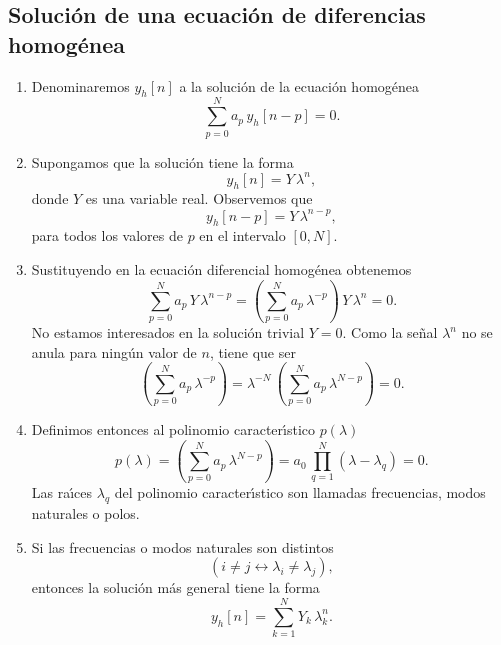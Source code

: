 \subsection{Soluci\'{o}n de una ecuaci\'{o}n de diferencias homog\'{e}nea}

\begin{enumerate}

\item Denominaremos $y_{h}\left[ n\right] $ a la soluci\'{o}n de la ecuaci\'{o}n homog\'{e}nea
\begin{equation}
        \sum_{p=0}^{N}a_{p} \, y_{h}\left[ n-p\right] =0.
\end{equation}

\item Supongamos que la soluci\'{o}n tiene la forma 
\begin{equation}
        y_{h}\left[ n\right] = Y \, \lambda^n,
\end{equation}
donde $Y$ es una variable real. Observemos que 
\begin{equation}
    y_{h}\left[ n-p\right] = Y \, \lambda^{n-p},
\end{equation}
para todos los valores de $p$ en el intervalo $[0,N]$.

\item Sustituyendo en la ecuaci\'{o}n diferencial homog\'{e}nea obtenemos 
\begin{equation}
    \sum_{p=0}^{N}a_{p} \, Y \, \lambda^{n-p}  =\left( \sum_{p=0}^{N}a_{p} \, \lambda^{-p} \right) \, Y \, \lambda^{n}=0.
\end{equation}
No estamos interesados en la soluci\'{o}n trivial $Y=0$. Como la se\~{n}al $\lambda^{n}$ no se anula para 
ning\'{u}n valor de $n$, tiene que ser 
\begin{equation}
  \left( \sum_{p=0}^{N}a_{p} \, \lambda ^{-p}\right) =
  \lambda^{-N} \, \left( \sum_{p=0}^{N}a_{p} \, \lambda ^{N-p}\right) = 0.
\end{equation}

\item Definimos entonces al polinomio caracter\'{\i}stico $p(\lambda)$
\begin{equation}
  p(\lambda) = \left( \sum_{p=0}^{N}a_{p} \, \lambda ^{N-p}\right) = 
  a_{0} \, \prod_{q=1}^{N} \left( \lambda - \lambda_{q} \right) = 0.
\end{equation}
Las ra\'{\i}ces $\lambda_{q}$ del polinomio caracter\'{\i}stico son llamadas 
frecuencias, modos naturales o polos.

\item Si las frecuencias o modos naturales son distintos 
\begin{equation}
        \left( i\neq j\longleftrightarrow \lambda _i\neq \lambda _{j}\right),
\end{equation}
entonces la soluci\'{o}n m\'{a}s general tiene la forma 
\begin{equation}
        y_{h}\left[ n\right] =\sum_{k=1}^{N}Y_{k} \, \lambda _{k}^n.
\end{equation}


\end{enumerate}
